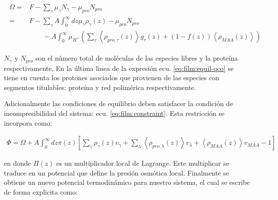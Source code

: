 \begin{align}
	\begin{aligned}
		\Omega = &F - \sum_\gamma \mu_\gamma N_\gamma -  \mu_{pro} N_{pro} \\
			= &F -\sum_\gamma A\int_0^\infty dz \mu_\gamma \rho_\gamma(z) -  \mu_{pro} N_{pro}  \\
			& \qquad -A\int_0^\infty \mu_{H^+} \left( \sum_\tau\left< \rho_{pro,\tau}(z) \right>g_\tau(z) + (1-f(z))\left< \rho_{MAA}(z) \right> \right )
			\end{aligned}
		\label{eq:film:equil-qco}
\end{align}

\noindent $N_\gamma$ y $ N_{pro}$ son el n\'umero total de mol\'eculas de las especies libres y la prote\'ina respectivamente. En la \'ultima linea de la expresi\'on ecu. \ref{eq:film:equil-qco} se tiene en cuenta los protones asociados que  provienen de las especies con segmentos titulables: prote\'ina y red polim\'erica respectivamente.


Adicionalmente las condiciones de equilibrio deben satisfacer la condici\'on de incompresibilidad del sistema: ecu. \ref{eq:film:constraint}.  Esta restricci\'on se incorpora como:

\begin{align}
	\Phi = \Omega +A \int_0^\infty dz\pi(z){\left[\sum_{\gamma}\rho_\gamma(z) v_\gamma + \sum_\lambda{\left<\rho_{pro,\lambda}(z)\right>v_\lambda} + \left<\rho_{MAA}(z)\right>v_{MAA} -1 \right]}
\end{align}


\noindent en donde $\Pi(z)$ es un multiplicador local de Lagrange.  Este multiplicar se traduce en un potencial que define la presi\'on osm\'otica local. Finalmente se obtiene un nuevo potencial termodin\'amico para nuestro sistema, el cual se escribe de forma explicita como:
 
